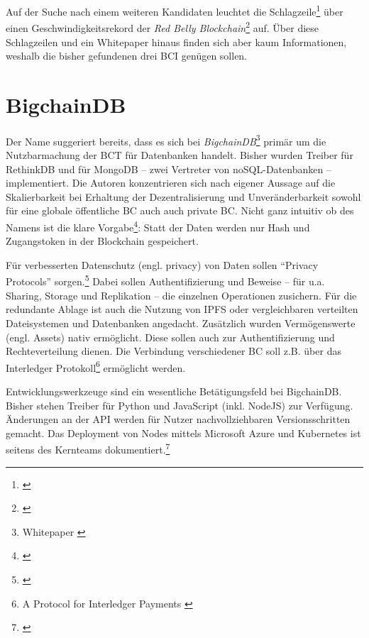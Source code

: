 Auf der Suche nach einem weiteren Kandidaten leuchtet die Schlagzeile\footnote{\autocite{w:rebealley:sydney}} über einen Geschwindigkeitsrekord der \emph{Red Belly Blockchain}\footnote{\autocite{p:rbbc}} auf.
Über diese Schlagzeilen und ein Whitepaper hinaus finden sich aber kaum Informationen, weshalb die bisher gefundenen drei \gls{BCI} genügen sollen.

\section{BigchainDB}

Der Name suggeriert bereits, dass es sich bei \emph{BigchainDB}\footnote{Whitepaper \autocite{p:bigchaindb}} primär um die Nutzbarmachung der \gls{BCT} für Datenbanken handelt.
Bisher wurden Treiber für RethinkDB und für MongoDB -- zwei Vertreter von noSQL-Datenbanken -- implementiert. Die Autoren konzentrieren sich nach eigener Aussage auf die Skalierbarkeit bei Erhaltung der Dezentralisierung und Unveränderbarkeit sowohl für eine globale öffentliche \gls{BC} auch auch private \gls{BC}.
Nicht ganz intuitiv ob des Namens ist die klare Vorgabe\footnote{\autocite{w:bcdb:features}}: Statt der Daten werden nur Hash und Zugangstoken in der Blockchain gespeichert.

Für verbesserten Datenschutz (engl. privacy) von Daten sollen \enquote{Privacy Protocols} sorgen.\footnote{\cite{w:github-bigchaindb-pp}}
Dabei sollen Authentifizierung und Beweise -- für u.a. Sharing, Storage und Replikation -- die einzelnen Operationen zusichern.
Für die redundante Ablage ist auch die Nutzung von \gls{IPFS} oder vergleichbaren verteilten Dateisystemen und Datenbanken angedacht.
Zusätzlich wurden Vermögenswerte (engl. Assets) nativ ermöglicht.
Diese sollen auch zur Authentifizierung und Rechteverteilung dienen.
Die Verbindung verschiedener \gls{BC} soll z.B. über das Interledger Protokoll\footnote{A Protocol for Interledger Payments \autocite{p:interledger}}\label{first:interledger} ermöglicht werden.

Entwicklungswerkzeuge sind ein wesentliche Betätigungsfeld bei BigchainDB.
Bisher stehen Treiber für Python und JavaScript (inkl. NodeJS) zur Verfügung.
Änderungen an der API werden für Nutzer nachvollziehbaren Versionsschritten gemacht.
Das Deployment von Nodes mittels Microsoft Azure und Kubernetes ist seitens des Kernteams dokumentiert.\footnote{\cite{w:bigchaindb-proddepl}}

